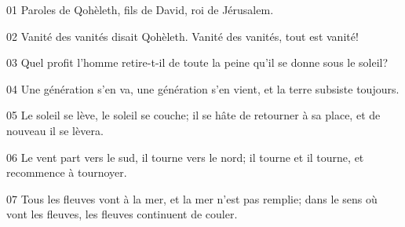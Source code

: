01 Paroles de Qohèleth, fils de David, roi de Jérusalem.

02 Vanité des vanités disait Qohèleth. Vanité des vanités, tout est vanité!

03 Quel profit l’homme retire-t-il de toute la peine qu’il se donne sous le soleil?

04 Une génération s’en va, une génération s’en vient, et la terre subsiste toujours.

05 Le soleil se lève, le soleil se couche; il se hâte de retourner à sa place, et de nouveau il se lèvera.

06 Le vent part vers le sud, il tourne vers le nord; il tourne et il tourne, et recommence à tournoyer.

07 Tous les fleuves vont à la mer, et la mer n’est pas remplie; dans le sens où vont les fleuves, les fleuves continuent de couler.
